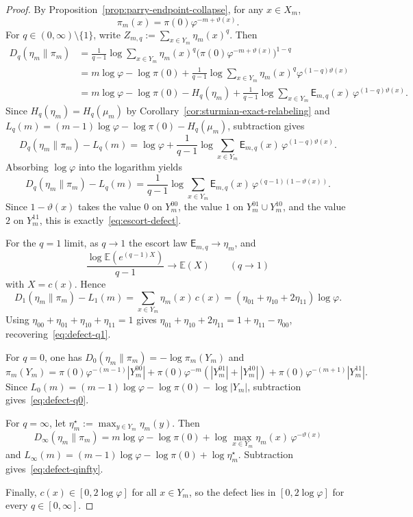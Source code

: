 \begin{proof}
By Proposition~\ref{prop:parry-endpoint-collapse}, for any \(x\in X_m\),
\[
\pi_m(x)=\pi(0)\varphi^{-m+\vartheta(x)}.
\]
For \(q\in(0,\infty)\setminus\{1\}\), write
\(Z_{m,q}:=\sum_{x\in Y_m}\eta_m(x)^q\). Then
\[
\begin{aligned}
D_q(\eta_m\|\pi_m)
&=
\frac{1}{q-1}
\log\sum_{x\in Y_m}\eta_m(x)^q
\bigl(\pi(0)\varphi^{-m+\vartheta(x)}\bigr)^{1-q}\\
&=
m\log\varphi-\log\pi(0)
+\frac{1}{q-1}
\log\sum_{x\in Y_m}\eta_m(x)^q\varphi^{(1-q)\vartheta(x)}\\
&=
m\log\varphi-\log\pi(0)-H_q(\eta_m)
+\frac{1}{q-1}
\log\sum_{x\in Y_m}\mathsf{E}_{m,q}(x)\,\varphi^{(1-q)\vartheta(x)}.
\end{aligned}
\]
Since \(H_q(\eta_m)=H_q(\mu_m)\) by
Corollary~\ref{cor:sturmian-exact-relabeling} and
\(L_q(m)=(m-1)\log\varphi-\log\pi(0)-H_q(\mu_m)\), subtraction gives
\[
D_q(\eta_m\|\pi_m)-L_q(m)
=
\log\varphi
+\frac{1}{q-1}
\log\sum_{x\in Y_m}\mathsf{E}_{m,q}(x)\,\varphi^{(1-q)\vartheta(x)}.
\]
Absorbing \(\log\varphi\) into the logarithm yields
\[
D_q(\eta_m\|\pi_m)-L_q(m)
=
\frac{1}{q-1}
\log\sum_{x\in Y_m}\mathsf{E}_{m,q}(x)\,\varphi^{(q-1)(1-\vartheta(x))}.
\]
Since \(1-\vartheta(x)\) takes the value \(0\) on \(Y_m^{00}\), the value
\(1\) on \(Y_m^{01}\cup Y_m^{10}\), and the value \(2\) on \(Y_m^{11}\),
this is exactly~\eqref{eq:escort-defect}.

For the \(q=1\) limit, as \(q\to 1\) the escort law
\(\mathsf{E}_{m,q}\to\eta_m\), and
\[
\frac{\log\mathbb{E}(e^{(q-1)X})}{q-1}\to\mathbb{E}(X)
\qquad(q\to 1)
\]
with \(X=c(x)\). Hence
\[
D_1(\eta_m\|\pi_m)-L_1(m)
=\sum_{x\in Y_m}\eta_m(x)\,c(x)
=(\eta_{01}+\eta_{10}+2\eta_{11})\log\varphi.
\]
Using \(\eta_{00}+\eta_{01}+\eta_{10}+\eta_{11}=1\) gives
\(\eta_{01}+\eta_{10}+2\eta_{11}=1+\eta_{11}-\eta_{00}\),
recovering~\eqref{eq:defect-q1}.

For \(q=0\), one has \(D_0(\eta_m\|\pi_m)=-\log\pi_m(Y_m)\) and
\[
\pi_m(Y_m)
=
\pi(0)\varphi^{-(m-1)}|Y_m^{00}|
+\pi(0)\varphi^{-m}(|Y_m^{01}|+|Y_m^{10}|)
+\pi(0)\varphi^{-(m+1)}|Y_m^{11}|.
\]
Since \(L_0(m)=(m-1)\log\varphi-\log\pi(0)-\log|Y_m|\), subtraction
gives~\eqref{eq:defect-q0}.

For \(q=\infty\), let \(\eta_m^\star:=\max_{y\in Y_m}\eta_m(y)\). Then
\[
D_\infty(\eta_m\|\pi_m)
=
m\log\varphi-\log\pi(0)
+\log\max_{x\in Y_m}\eta_m(x)\,\varphi^{-\vartheta(x)}
\]
and
\(L_\infty(m)=(m-1)\log\varphi-\log\pi(0)+\log\eta_m^\star\).
Subtraction gives~\eqref{eq:defect-qinfty}.

Finally, \(c(x)\in[0,2\log\varphi]\) for all \(x\in Y_m\), so the defect
lies in \([0,2\log\varphi]\) for every \(q\in[0,\infty]\).
\end{proof}

